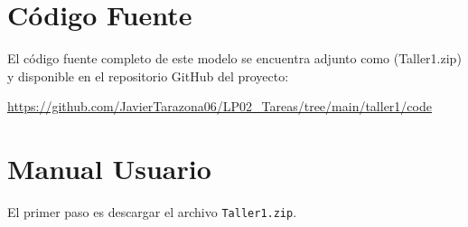 \documentclass{article}
\begin{document}

\section{Código Fuente}\label{sec:cod}

El código fuente completo de este modelo se encuentra adjunto como 
(Taller1.zip)
y disponible en el repositorio GitHub del proyecto:

\begin{center}
\url{https://github.com/JavierTarazona06/LP02_Tareas/tree/main/taller1/code}
\end{center}


\section{Manual Usuario}\label{sec:man_u}

El primer paso es descargar el archivo \texttt{Taller1.zip}.
\end{document}
